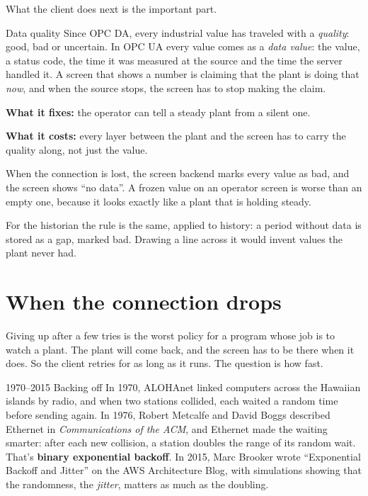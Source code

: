 What the client does next is the important part.

\begin{concept}{Data quality}
Since OPC DA, every industrial value has traveled with a \emph{quality}: good,
bad or uncertain. In OPC UA every value comes as a \emph{data value}: the value,
a status code, the time it was measured at the source and the time the server
handled it. A screen that shows a number is claiming that the plant is doing
that \emph{now}, and when the source stops, the screen has to stop making the
claim.

\textbf{What it fixes:} the operator can tell a steady plant from a silent one.

\textbf{What it costs:} every layer between the plant and the screen has to
carry the quality along, not just the value.
\end{concept}

When the connection is lost, the screen backend marks every value as bad, and
the screen shows ``no data''. A frozen value on an operator screen is worse than
an empty one, because it looks exactly like a plant that is holding steady.

For the historian the rule is the same, applied to history: a period without
data is stored as a gap, marked bad. Drawing a line across it would invent
values the plant never had.

\section{When the connection drops}

Giving up after a few tries is the worst policy for a program whose job is to
watch a plant. The plant will come back, and the screen has to be there when it
does. So the client retries for as long as it runs. The question is how fast.

\begin{history}{1970--2015 \textperiodcentered{} Backing off}
In 1970, ALOHAnet linked computers across the Hawaiian islands by radio, and
when two stations collided, each waited a random time before sending again. In
1976, Robert Metcalfe and David Boggs described Ethernet in \emph{Communications
of the ACM}, and Ethernet made the waiting smarter: after each new collision, a
station doubles the range of its random wait. That's \textbf{binary exponential
backoff}. In 2015, Marc Brooker wrote ``Exponential Backoff and Jitter'' on the
AWS Architecture Blog, with simulations showing that the randomness, the
\emph{jitter}, matters as much as the doubling.
\end{history}

